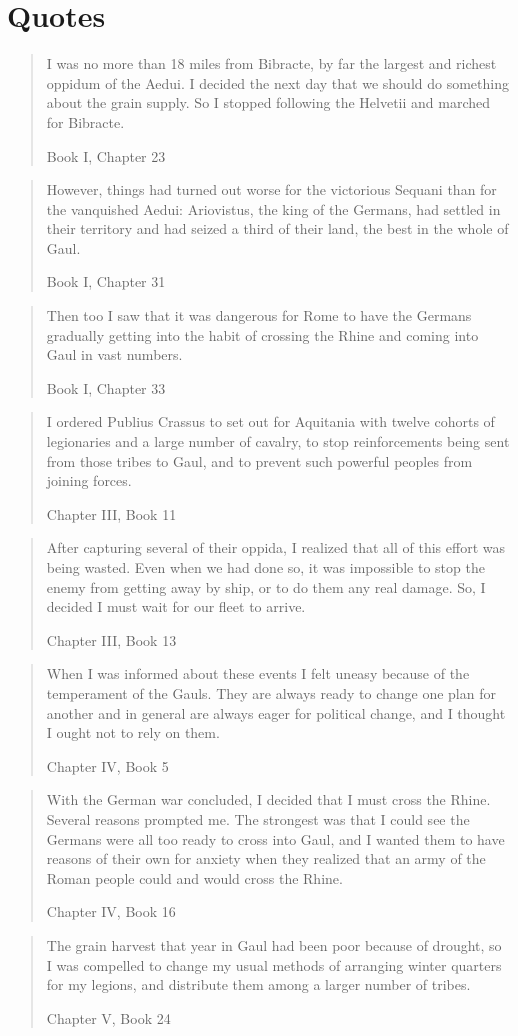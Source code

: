 \section{Quotes}
\par

\blockquote[Book I, Chapter 23]{I was no more than 18 miles from Bibracte, by far the largest and richest oppidum of the Aedui. I decided the next day that we should do something about the grain supply. So I stopped following the Helvetii and marched for Bibracte.}

\blockquote[Book I, Chapter 31]{However, things had turned out worse for the victorious Sequani than for the vanquished Aedui: Ariovistus, the king of the Germans, had settled in their territory and had seized a third of their land, the best in the whole of Gaul.}

\blockquote[Book I, Chapter 33]{Then too I saw that it was dangerous for Rome to have the Germans gradually getting into the habit of crossing the Rhine and coming into Gaul in vast numbers.}

\blockquote[Chapter III, Book 11]{I ordered Publius Crassus to set out for Aquitania with twelve cohorts of legionaries and a large number of cavalry, to stop reinforcements being sent from those tribes to Gaul, and to prevent such powerful peoples from joining forces.}

\blockquote[Chapter III, Book 13]{After capturing several of their oppida, I realized that all of this effort was being wasted. Even when we had done so, it was impossible to stop the enemy from getting away by ship, or to do them any real damage. So, I decided I must wait for our fleet to arrive.}

\blockquote[Chapter IV, Book 5]{When I was informed about these events I felt uneasy because of the temperament of the Gauls. They are always ready to change one plan for another and in general are always eager for political change, and I thought I ought not to rely on them.}

\blockquote[Chapter IV, Book 16]{With the German war concluded, I decided that I must cross the Rhine. Several reasons prompted me. The strongest was that I could see the Germans were all too ready to cross into Gaul, and I wanted them to have reasons of their own for anxiety when they realized that an army of the Roman people could and would cross the Rhine.}

\blockquote[Chapter V, Book 24]{The grain harvest that year in Gaul had been poor because of drought, so I was compelled to change my usual methods of arranging winter quarters for my legions, and distribute them among a larger number of tribes.}

